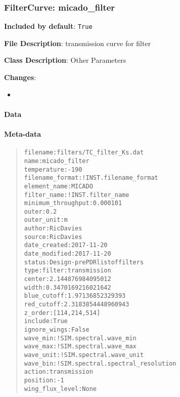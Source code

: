 \subsubsection{FilterCurve: \textquotedbl{}micado\_filter\textquotedbl{}%
  \label{filtercurve-micado-filter}%
}

\textbf{Included by default}: \texttt{True}

\textbf{File Description}: transmission curve for filter

\textbf{Class Description}: Other Parameters

\textbf{Changes}:

\begin{itemize}
\item \end{itemize}


\paragraph{Data%
  \label{data}%
}


\paragraph{Meta-data%
  \label{meta-data}%
}

\begin{quote}
\begin{alltt}
          filename : filters/TC_filter_Ks.dat
              name : micado_filter
       temperature : -190
   filename_format : !INST.filename_format
      element_name : MICADO
       filter_name : !INST.filter_name
minimum_throughput : 0.000101
             outer : 0.2
        outer_unit : m
            author : Ric Davies
            source : Ric Davies
      date_created : 2017-11-20
     date_modified : 2017-11-20
            status : Design - pre PDR list of filters
              type : filter:transmission
            center : 2.144876984095012
             width : 0.3470169216021642
       blue_cutoff : 1.97136852329393
        red_cutoff : 2.3183854448960943
           z_order : [114, 214, 514]
           include : True
      ignore_wings : False
          wave_min : !SIM.spectral.wave_min
          wave_max : !SIM.spectral.wave_max
         wave_unit : !SIM.spectral.wave_unit
          wave_bin : !SIM.spectral.spectral_resolution
            action : transmission
          position : -1
   wing_flux_level : None
\end{alltt}
\end{quote}


